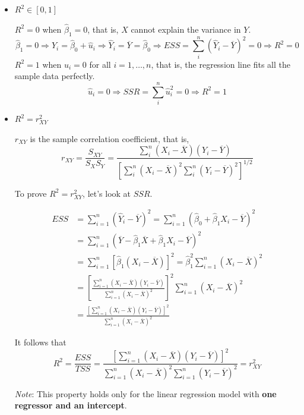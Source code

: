 \documentclass[a4paper,11pt]{article}
\begin{document}
\begin{itemize}
\item \(R^2 \in [0, 1]\)
\label{sec:org36099ae}

\(R^2 = 0\) when \(\hat{\beta}_1 = 0\), that is, \(X\) cannot explain the
variance in \(Y\).
\begin{equation*}
\hat{\beta}_1 = 0 \Rightarrow Y_i = \hat{\beta}_0 + \hat{u}_i
\Rightarrow \hat{Y}_i = \overline{Y} = \hat{\beta}_0 \Rightarrow ESS
= \sum_i^n (\hat{Y}_i - \overline{Y})^2 = 0 \Rightarrow R^2 = 0
\end{equation*}
\(R^2 = 1\) when \(\hat{u}_i = 0\) for all \(i = 1, \ldots, n\), that is,
the regression line fits all the sample data perfectly.
\[ \hat{u}_i = 0 \Rightarrow SSR = \sum_i^n \hat{u}_i^2 = 0
  \Rightarrow R^2 = 1 \]

\item \(R^2 = r^2_{XY}\)
\label{sec:org5b70932}

\(r_{XY}\) is the sample correlation coefficient, that is,
\[ r_{XY} = \frac{S_{XY}}{S_X S_Y} = \frac{\sum_i^n(X_i -
  \overline{X})(Y_i - \overline{Y})}{\left[\sum_i^n (X_i - \overline{X})^2 \sum_i^n (Y_i -
  \overline{Y})^2 \right]^{1/2}} \]

To prove \(R^2 = r^2_{XY}\), let's look at \(SSR\).

\begin{align*}
ESS &= \sum_{i=1}^n (\hat{Y}_i - \overline{Y})^2 = \sum_{i=1}^n (\hat{\beta}_0 + \hat{\beta}_1 X_i - \overline{Y})^2 \\
&= \sum_{i=1}^n (\overline{Y} - \hat{\beta}_1 \overline{X} + \hat{\beta}_1 X_i - \overline{Y})^2 \\
&= \sum_{i=1}^n \left[ \hat{\beta}_1 (X_i - \overline{X}) \right]^2 = \hat{\beta}_1^2 \sum_{i=1}^n (X_i - \overline{X})^2 \\
&= \left[\frac{\sum_{i=1}^n (X_i - \overline{X})(Y_i - \overline{Y})}{\sum_{i=1}^n (X_i - \overline{X})^2}\right]^2 \sum_{i=1}^n (X_i - \overline{X})^2 \\
&= \frac{\left[ \sum_{i=1}^n (X_i - \overline{X})(Y_i - \overline{Y}) \right]^2}{\sum_{i=1}^n (X_i - \overline{X})^2}
\end{align*}

It follows that
\[
  R^2 = \frac{ESS}{TSS} = \frac{\left[ \sum_{i=1}^n (X_i - \overline{X})(Y_i - \overline{Y}) \right]^2}{\sum_{i=1}^n (X_i - \overline{X})^2 \sum_{i=1}^n (Y_i - \overline{Y})^2} = r^2_{XY}
  \]

\emph{Note}: This property holds only for the linear regression model
with \textbf{one regressor and an intercept}.
\end{itemize}
\end{document}
